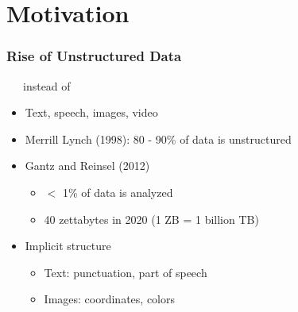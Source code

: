 \section[intro]{Motivation}

\begin{frame}
    \frametitle{Rise of Unstructured Data}

\begin{center}
  $\,\!\quad$ instead of $\,\!\quad$   
\end{center}

\begin{itemize}
    \item Text, speech, images, video
\end{itemize}
\begin{itemize}
    \item \textcolor{iseblue}{Merrill Lynch (1998)}: 80 - 90\% of data is unstructured
\end{itemize}

\begin{itemize}
    \item \textcolor{iseblue}{Gantz and Reinsel (2012)}
    \begin{itemize}
        \item $<$ 1\% of data is analyzed
        \item 40 zettabytes in 2020 (1 ZB = 1 billion TB)
    \end{itemize}
\end{itemize}

\begin{itemize}
    \item Implicit structure
    \begin{itemize}
        \item Text: punctuation, part of speech
        \item Images: coordinates, colors
    \end{itemize}
\end{itemize}

\end{frame}

